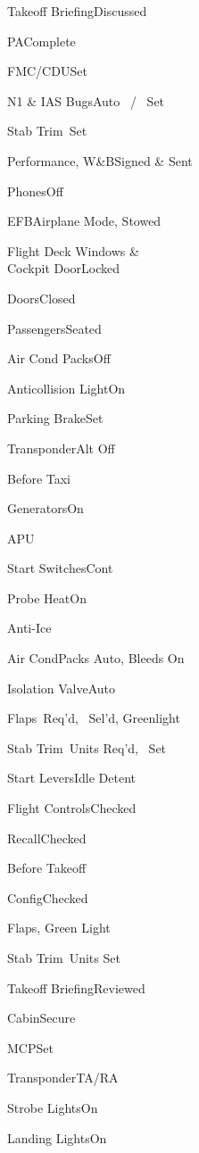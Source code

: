 \documentclass[sim-use]{checklist}
\begin{document}
\begin{continuedchecklist}
  \item{Takeoff Briefing}{Discussed}
  \item{PA}{Complete}
  \item{FMC/CDU}{Set}
  \item{N1 \& IAS Bugs}{Auto \blank\ / \blank\ Set}
  \item{Stab Trim}{\blank\ Set}
  \item{Performance, W\&B}{Signed \& Sent}
  \item{Phones}{Off}
  \item{EFB}{Airplane Mode, Stowed}
  \item{Flight Deck Windows \&\\Cockpit Door}{Locked}
  \item{Doors}{Closed}
  \item{Passengers}{Seated}
  \line
  \item{Air Cond Packs}{Off}
  \item{Anticollision Light}{On}
  \item{Parking Brake}{Set}
  \item{Transponder}{Alt Off}
\end{continuedchecklist}

\begin{checklist}{Before Taxi}
  \item{Generators}{On}
  \item{APU}{\blank}
  \item{Start Switches}{Cont}
  \item{Probe Heat}{On}
  \item{Anti-Ice}{\blank}
  \item{Air Cond}{Packs Auto, Bleeds On}
  \item{Isolation Valve}{Auto}
  \item{Flaps}{\blank\ Req'd, \blank\ Sel'd, Greenlight}
  \item{Stab Trim}{\blank\ Units Req'd, \blank\ Set}
  \item{Start Levers}{Idle Detent}
  \item{Flight Controls}{Checked}
  \item{Recall}{Checked}
\end{checklist}

\begin{checklist}{Before Takeoff}
  \item{Config}{Checked}
  \item{Flaps}{\blank, Green Light}
  \item{Stab Trim}{\blank\ Units Set}
  \item{Takeoff Briefing}{Reviewed}
  \item{Cabin}{Secure}
  \line
  \item{MCP}{Set}
  \item{Transponder}{TA/RA}
  \item{Strobe Lights}{On}
  \item{Landing Lights}{On}
\end{checklist}
\end{document}
